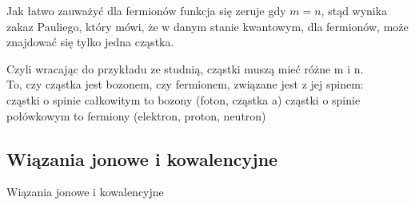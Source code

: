 \documentclass[a4paper,15pt]{article}
\newcommand{\issue}[2]{
    \begin{tcolorbox}[colback=issueColor!5!white,colframe=issueColor,title={Zagadnienie #1}]
        #2
    \end{tcolorbox}
}
\begin{document}
Jak łatwo zauważyć dla fermionów funkcja się zeruje gdy $m = n$, stąd wynika zakaz Pauliego, który mówi, że w danym stanie kwantowym, dla fermionów, może znajdować się tylko jedna cząstka. 

Czyli wracając do przykładu ze studnią, cząstki muszą mieć różne m i n. \\

To, czy cząstka jest bozonem, czy fermionem, związane jest z jej spinem: \\

cząstki o spinie całkowitym to bozony (foton, cząstka a) cząstki o spinie połówkowym to fermiony (elektron, proton, neutron) 






\newpage
\subsection{Wiązania jonowe i kowalencyjne}
\issue{}{
Wiązania jonowe i kowalencyjne
}
\end{document}
